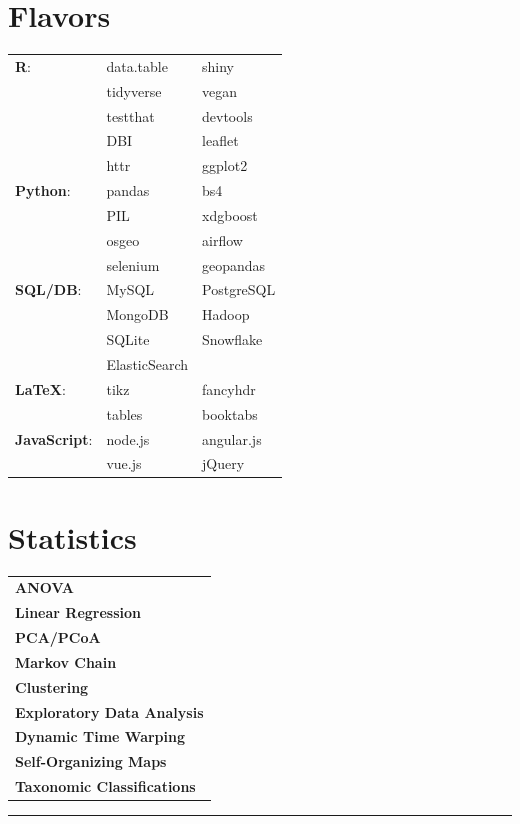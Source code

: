 \documentclass[10pt]{article}%
\begin{document}
\begin{minipage}[t]{.35\linewidth}%
\flushleft
\section*{\faCubes{} Flavors}%
   {\small
      \begin{tabularx}{\linewidth}{p{.2\linewidth}XX}
         \textbf{R}: & data.table & shiny \\
                     & tidyverse  & vegan \\
                     & testthat   & devtools \\
                     & DBI        & leaflet \\
                     & httr       & ggplot2 \\
         \hline
         \textbf{Python}: & pandas & bs4 \\
                          & PIL    & xdgboost \\
                          & osgeo  & airflow \\
                          & selenium & geopandas \\
         \hline
         \textbf{SQL/DB}: & MySQL & PostgreSQL \\
                       & MongoDB & Hadoop \\
                       & SQLite  & Snowflake \\
                       & ElasticSearch & \\
         \hline
         \textbf{\LaTeX }:  & tikz   & fancyhdr \\
                           & tables & booktabs \\
         \hline
         \textbf{JavaScript}: & node.js & angular.js \\
                              & vue.js & jQuery
     \end{tabularx}}
     \flushleft%
\end{minipage}
\begin{minipage}[t]{.4\linewidth}%
   \section*{\faBarChart{} Statistics}%
   \flushright
   {\small
      \begin{tabularx}{\linewidth}{X}
        \textbf{ANOVA} \\
        \textbf{Linear Regression} \\
        \textbf{PCA/PCoA} \\
        \textbf{Markov Chain} \\
        \textbf{Clustering} \\
        \textbf{Exploratory Data Analysis} \\
        \textbf{Dynamic Time Warping} \\
        \textbf{Self-Organizing Maps} \\
        \textbf{Taxonomic Classifications} \\
      \end{tabularx}}
      \flushleft%
\end{minipage}
\par\noindent\rule{\textwidth}{0.4pt}
\end{document}
